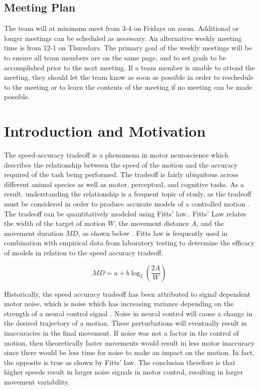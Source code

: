 \documentclass[table,12pt]{article}
\begin{document}
\subsection{Meeting Plan}
The team will at minimum meet from 3-4 on Fridays on zoom. Additional or longer meetings can be scheduled as necessary. An alternative weekly meeting time is from 12-1 on Thursdays. The primary goal of the weekly meetings will be to ensure all team members are on the same page, and to set goals to be accomplished prior to the next meeting. If a team member is unable to attend the meeting, they should let the team know as soon as possible in order to reschedule to the meeting or to learn the contents of the meeting if no meeting can be made possible.

\section{Introduction and Motivation}

The speed-accuracy tradeoff is a phenomena in motor neuroscience which describes the relationship between the speed of the motion and the accuracy required of the task being performed. The tradeoff is fairly ubiquitous across different animal species as well as motor, perceptual, and cognitive tasks. As a result, understanding the relationship is a frequent topic of study, as the tradeoff must be considered in order to produce accurate models of a controlled motion \cite{c3}. The tradeoff can be quantitatively modeled using Fitts’ law.. Fitts’ Law relates the width of the target of motion $W$, the movement distance $A$, and the movement duration $MD$, as shown below \cite{c1}. Fitts law is frequently used in combination with empirical data from laboratory testing to determine the efficacy of models in relation to the speed accuracy tradeoff.  

\begin{equation}
    MD = a + b \log_2 \left(\frac{2A}{W}\right) \label{eq:fitts_law}
\end{equation}

 Historically, the speed accuracy tradeoff has been attributed to signal dependent motor noise, which is noise which has increasing variance depending on the strength of a neural control signal \cite{c2}. Noise in neural control will cause a change in the desired trajectory of a motion. These perturbations will eventually result in inaccuracies in the final movement. If noise was not a factor in the control of motion, then theoretically faster movements would result in less motor inaccuracy since there would be less time for noise to make an impact on the motion. In fact, the opposite is true as shown by Fitts’ law. The conclusion therefore is that higher speeds result in larger noise signals in motor control, resulting in larger movement variability.
\end{document}
